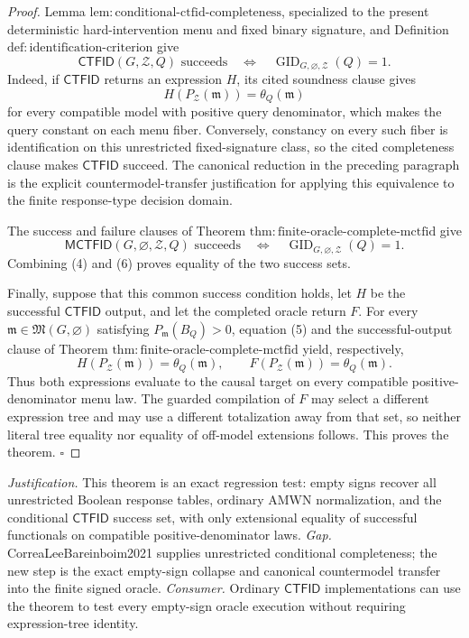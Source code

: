 \documentclass{article}
\begin{document}
\begin{proof}
Lemma \(\mathrm{lem:conditional\text{-}ctfid\text{-}completeness}\), specialized to the present deterministic hard-intervention menu and fixed binary signature, and Definition \(\mathrm{def:identification\text{-}criterion}\) give
\[
 \mathsf{CTFID}(G,\mathcal Z,Q)\text{ succeeds}
 \quad\Longleftrightarrow\quad
 \operatorname{GID}_{G,\varnothing,\mathcal Z}(Q)=1.
\tag{4}
\]
Indeed, if \(\mathsf{CTFID}\) returns an expression \(H\), its cited soundness clause gives
\[
 H(P_{\mathcal Z}(\mathfrak m))=\theta_Q(\mathfrak m)
\tag{5}
\]
for every compatible model with positive query denominator, which makes the query constant on each menu fiber.  Conversely, constancy on every such fiber is identification on this unrestricted fixed-signature class, so the cited completeness clause makes \(\mathsf{CTFID}\) succeed.  The canonical reduction in the preceding paragraph is the explicit countermodel-transfer justification for applying this equivalence to the finite response-type decision domain.

The success and failure clauses of Theorem \(\mathrm{thm:finite\text{-}oracle\text{-}complete\text{-}mctfid}\) give
\[
 \mathsf{MCTFID}(G,\varnothing,\mathcal Z,Q)\text{ succeeds}
 \quad\Longleftrightarrow\quad
 \operatorname{GID}_{G,\varnothing,\mathcal Z}(Q)=1.
\tag{6}
\]
Combining (4) and (6) proves equality of the two success sets.

Finally, suppose that this common success condition holds, let \(H\) be the successful \(\mathsf{CTFID}\) output, and let the completed oracle return \(F\).  For every \(\mathfrak m\in\mathfrak M(G,\varnothing)\) satisfying \(P_{\mathfrak m}(B_Q)>0\), equation (5) and the successful-output clause of Theorem \(\mathrm{thm:finite\text{-}oracle\text{-}complete\text{-}mctfid}\) yield, respectively,
\[
 H(P_{\mathcal Z}(\mathfrak m))=\theta_Q(\mathfrak m),
 \qquad
 F(P_{\mathcal Z}(\mathfrak m))=\theta_Q(\mathfrak m).
\]
Thus both expressions evaluate to the causal target on every compatible positive-denominator menu law.  The guarded compilation of \(F\) may select a different expression tree and may use a different totalization away from that set, so neither literal tree equality nor equality of off-model extensions follows.  This proves the theorem. \(\square\)
\end{proof}
\par\smallskip\noindent \textit{Justification.} This theorem is an exact regression test: empty signs recover all unrestricted Boolean response tables, ordinary AMWN normalization, and the conditional \(\mathsf{CTFID}\) success set, with only extensional equality of successful functionals on compatible positive-denominator laws. \textit{Gap.} CorreaLeeBareinboim2021 supplies unrestricted conditional completeness; the new step is the exact empty-sign collapse and canonical countermodel transfer into the finite signed oracle. \textit{Consumer.} Ordinary \(\mathsf{CTFID}\) implementations can use the theorem to test every empty-sign oracle execution without requiring expression-tree identity.
\end{document}
